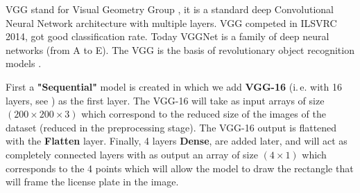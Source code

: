 \documentclass[lnbip]{svmultln}
\newcommand{\ie}{i.\,e. }
\begin{document}
	VGG stand for Visual Geometry Group \cite[][chap. 10]{antoine2018apprentissage}, it is a standard deep Convolutional Neural Network architecture with multiple layers. VGG competed in ILSVRC 2014, got good classification rate. Today VGGNet is a family of deep neural networks (from A to E). The VGG is the basis of revolutionary object recognition models \cite[]{tammina2019transfer}.  
	
 	First a \textbf{"Sequential"} model is created in which we add \textbf{VGG-16} (\ie with 16 layers, see \cite[]{antoine2018apprentissage, geron2017hands}) as the first layer. The VGG-16 will take as input arrays of size $(200 \times 200 \times 3)$ which correspond to the reduced size of the images of the dataset (reduced in the preprocessing stage).
 	The VGG-16 output is flattened with the \textbf{Flatten} layer. Finally, 4 layers \textbf{Dense}, are added later, and will act as completely connected layers with as output an array of size $(4 \times 1)$ which corresponds to the 4 points which will allow the model to draw the rectangle that will frame the license plate in the image.
 	
\end{document}
